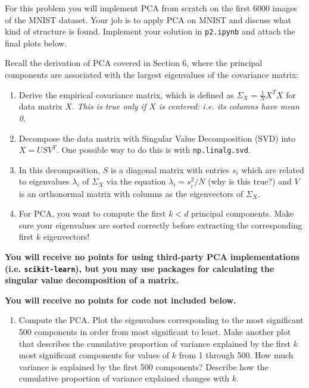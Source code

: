 \documentclass[submit]{harvardml}
\begin{document}
\begin{problem}

  
For this problem you will implement PCA from scratch on the first 6000 images of the MNIST dataset. Your job is to apply PCA on MNIST and discuss what kind of structure is found. Implement your solution in \texttt{p2.ipynb} and attach the final plots below.

Recall the derivation of PCA covered in Section 6, where the principal components are associated with the largest eigenvalues of the covariance matrix: 

\begin{enumerate}[label=(\alph*)]
    \item Derive the empirical covariance matrix, which is defined as $\Sigma_X = \frac{1}{N}X^TX$ for data matrix $X$. \textit{This is true only if $X$ is centered: i.e. its columns have mean 0.}
    \item Decompose the data matrix with Singular Value Decomposition (SVD) into $X = USV^T$. One possible way to do this is with {\normalfont \texttt{np.linalg.svd}}.
    \item In this decomposition, $S$ is a diagonal matrix with entries $s_{i}$ which are related to eigenvalues $\lambda_{i}$ of $\Sigma_X$ via the equation $\lambda_i = s_i^2/N$ (why is this true?) and $V$ is an orthonormal matrix with columns as the eigenvectors of $\Sigma_X$.
    \item For PCA, you want to compute the first $k < d$ principal components. Make sure your eigenvalues are sorted correctly before extracting the corresponding first $k$ eigenvectors!
\end{enumerate}

{\bfseries You will receive no points for using third-party PCA implementations (i.e. {\normalfont \texttt{scikit-learn}}), but you may use packages for calculating the singular value decomposition of a matrix.}

{\bfseries You will receive no points for code not included below.}
\begin{enumerate}

\item Compute the PCA. Plot the eigenvalues corresponding to the most
  significant 500 components in order from most significant to
  least. Make another plot that describes the cumulative proportion of
  variance explained by the first $k$ most significant components for
  values of $k$ from 1 through 500.  How much variance is explained by
  the first 500 components?  Describe how the cumulative proportion of
  variance explained changes with $k$. 
  

\end{enumerate}
\end{problem}
\end{document}
